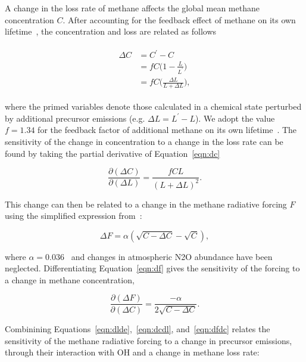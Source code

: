 A change in the loss rate of methane affects the global mean methane concentration $C$. After accounting for the feedback effect of methane on its own lifetime~\citep{ref:fuglestvedt1999,ref:naik2005}, the concentration and loss are related as follows

\begin{equation}
\begin{align}
\begin{split}
\Delta C &= C^{\prime} - C \\
         &= f C \Big(1 - \frac{L}{L^{\prime}}\Big) \\
         &= fC\Big(\frac{\Delta L}{L+\Delta L}\Big),
\end{split}
\label{eqn:dc}
\end{align}
\end{equation}

where the primed variables denote those calculated in a chemical state perturbed by additional precursor emissions (e.g. $\Delta L = L^{\prime}-L$).  We adopt the value $f=1.34$ for the feedback factor of additional methane on its own lifetime~\citep{ref:holmes2013}. The sensitivity of the change in concentration to a change in the loss rate can be found by taking the partial derivative of Equation~\ref{eqn:dc}

\begin{equation}
\frac{\partial (\Delta C)}{\partial (\Delta L)} = \frac{fCL}{(L+\Delta L)^2}.
\label{eqn:dcdl}
\end{equation}

This change can then be related to a change in the methane radiative forcing $F$ using the simplified expression from~\citet{ref:myhre1998}:

\begin{equation}
\Delta F = \alpha (\sqrt{C-\Delta C} - \sqrt{C}),
\label{eqn:df}
\end{equation}

where $\alpha=0.036$~\citep{ref:myhre1998} and changes in atmospheric N2O abundance have been neglected. Differentiating Equation~\ref{eqn:df} gives the sensitivity of the forcing to a change in methane concentration,

\begin{equation}
\frac{\partial (\Delta F)}{\partial (\Delta C)} = \frac{-\alpha}{2\sqrt{C-\Delta C}}.
\label{eqn:dfdc}
\end{equation}

Combinining Equations~\ref{eqn:dlde},~\ref{eqn:dcdl}, and~\ref{eqn:dfdc} relates the sensitivity of the methane radiative forcing to a change in precursor emissions, through their interaction with OH and a change in methane loss rate:


